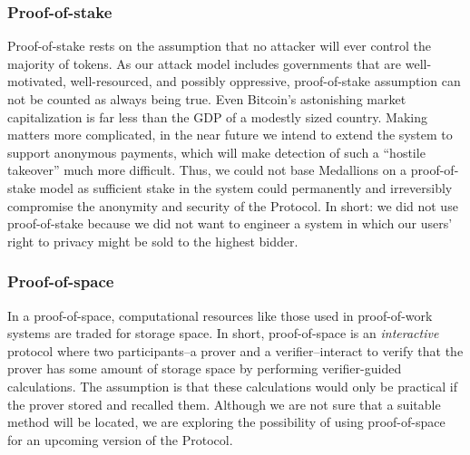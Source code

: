 \subsubsection*{Proof-of-stake}

Proof-of-stake rests on the assumption that no attacker will ever control the majority of tokens. 
As our attack model includes governments that are well-motivated, well-resourced, and possibly oppressive, proof-of-stake assumption can not be counted as always being true. Even Bitcoin’s astonishing market capitalization is far less than the GDP of a modestly sized country. 
Making matters more complicated, in the near future we intend to extend the system to support anonymous payments, which will make detection of such a ``hostile takeover'' much more difficult. Thus, we could not base Medallions on a proof-of-stake model as sufficient stake in the system could permanently and irreversibly compromise the anonymity and security of the \Orchid{} Protocol. In short: we did not use proof-of-stake because we did not want to engineer a system in which our users’ right to privacy might be sold to the highest bidder.

\subsubsection*{Proof-of-space}

In a proof-of-space, computational resources like those used in proof-of-work systems are traded for storage space. In short, proof-of-space is an \textit{interactive} protocol where two participants--a prover and a verifier--interact to verify that the prover has some amount of storage space by performing verifier-guided calculations. The assumption is that these calculations would only be practical if the prover stored and recalled them\cite{dziembowski2015proofs}. Although we are not sure that a suitable method will be located, we are exploring the possibility of using proof-of-space for an upcoming version of the \Orchid{} Protocol. 

